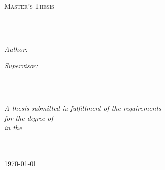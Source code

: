 \documentclass[
11pt, %
english, %
singlespacing, %
headsepline, %
]{MastersDoctoralThesis} %
\author{Oyetunji Daniel \textsc{Abioye}} %
\begin{document}
\frontmatter %

\pagestyle{plain} %


\begin{titlepage}
\begin{center}

\vspace*{.06\textheight}
{\scshape\LARGE \univname\par}\vspace{1.5cm} %
\textsc{\Large Master's Thesis}\\[0.5cm] %

\HRule \\[0.4cm] %
{\huge \bfseries \ttitle\par}\vspace{0.4cm} %
\HRule \\[1.5cm] %
 
\begin{minipage}[t]{0.4\textwidth}
\begin{flushleft} \large
\emph{Author:}\\
\href{https://www.oyetunji.com}{\authorname} %
\end{flushleft}
\end{minipage}
\begin{minipage}[t]{0.4\textwidth}
\begin{flushright} \large
\emph{Supervisor:} \\
\href{https://iscpif.fr}{\supname} \\ %
\end{flushright}
\end{minipage}\\[3cm]

\vfill

\large \textit{A thesis submitted in fulfillment of the requirements\\ for the degree of \degreename}\\[0.3cm] %
\textit{in the}\\[0.4cm]
\groupname\\\deptname\\[2cm] %
 
\vfill

{\large \today}\\[4cm] %
 
\vfill
\end{center}
\end{titlepage}
\end{document}
